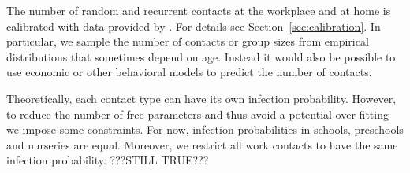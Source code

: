The number of random and recurrent contacts at the workplace and at home is calibrated with data provided by \cite{Mossong2008}. For details see Section~\ref{sec:calibration}. In particular, we sample the number of contacts or group sizes from empirical distributions that sometimes depend on age. Instead it would also be possible to use economic or other behavioral models to predict the number of contacts.

Theoretically, each contact type can have its own infection probability. However, to reduce the number of free parameters and thus avoid a potential over-fitting we impose some constraints. For now, infection probabilities in schools, preschools and nurseries are equal. Moreover, we restrict all work contacts to have the same infection probability. ???STILL TRUE???

